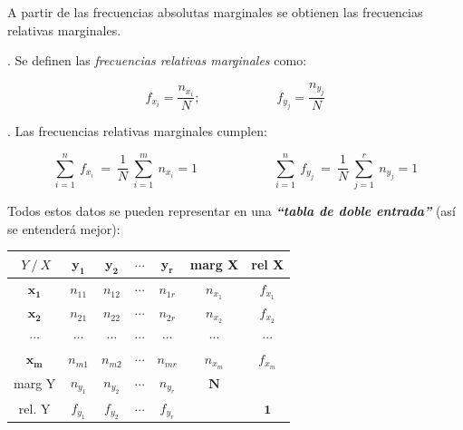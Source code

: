 	



A partir de las frecuencias absolutas marginales se obtienen las frecuencias relativas marginales.

\begin{definition}
.	 Se definen las \emph{frecuencias relativas marginales} como:

$$\displaystyle f_{x_i}= \dfrac{n_{x_i}}{N};\qquad \qquad \qquad 
f_{y_j}= \dfrac{n_{y_j}}{N}$$	
\end{definition}

\vspace{5mm} %
\begin{theorem}
.	Las frecuencias relativas marginales cumplen:

$$\displaystyle \sum_{i=1}^n\ f_{x_i} \ = \ \dfrac 1 N \ \sum_{i=1}^m\ n_{x_i}=1
\qquad \qquad \qquad   
\sum_{i=1}^n\ f_{y_j} \ = \ \dfrac 1 N \ \sum_{j=1}^r\ n_{y_j}=1$$	
\end{theorem}

\vspace{5mm} %
Todos estos datos se pueden representar en una \colorbox{orange!10}{\textbf{\emph{``tabla de doble entrada''}}} \textcolor{gris}{(así se entenderá mejor)}:


	
\begin{table}[H]
\large
\centering
\begin{tabular}{c|c|c|c|c|c|c}
\cline{1-5}
\multicolumn{1}{|c|}{\textbf{$\ Y \  /  \ X$}} & \textbf{$\boldsymbol{y_1}$} & \textbf{$\boldsymbol{y_2}$} & \textbf{$\cdots$} & \textbf{$\boldsymbol{y_r}$} & \scriptsize{marg X} & \scriptsize{rel X} \\ \hline
\multicolumn{1}{|c|}{\textbf{$\boldsymbol{x_1}$}} & $n_{11}$ & $n_{12}$ & $\cdots$ & $n_{1r}$ & $n_{x_1}$ & $f_{x_1}$ \\ \hline
\multicolumn{1}{|c|}{\textbf{$\boldsymbol{x_2}$}} & $n_{21}$ & $n_{22}$ & $\cdots$ & $n_{2r}$ & $n_{x_2}$ & $f_{x_2}$ \\ \hline
\multicolumn{1}{|c|}{\textbf{$\cdots$}} & $\cdots$ & $\cdots$ & $\cdots$ & $\cdots$ & $\cdots$ & $\cdots$ \\ \hline
\multicolumn{1}{|c|}{\textbf{$\boldsymbol{x_m}$}} & $n_{m1}$ & $n_{m2}$ & $\cdots$ & $n_{mr}$ & $n_{x_m}$ & $f_{x_m}$ \\ \hline
\multicolumn{1}{c|}{\scriptsize{marg Y}} & $n_{y_1}$ & $n_{y_2}$ & $\cdots$ & $n_{y_r}$ & \textbf{$\boldsymbol{N}$} &  \\ \cline{1-5}
\scriptsize{rel. Y} & $f_{y_1}$ & $f_{y_2}$ & $\cdots$ & $f_{y_r}$ &  & \textbf{$\boldsymbol{1}$}
\end{tabular}
\end{table}

